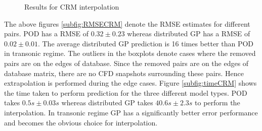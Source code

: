 \begin{figure}[!ht]
  \centering
  \quad
  \caption{Results for CRM interpolation}
\end{figure}

The above figures \ref{subfig:RMSECRM} denote the RMSE estimates for different pairs. POD has a RMSE of $0.32\pm0.23$ whereas distributed GP has a RMSE of $0.02\pm0.01$. The average distributed GP prediction is 16 times better than POD in transonic regime. The outliers in the boxplots denote cases where the removed pairs are on the edges of database. Since the removed pairs are on the edges of database matrix, there are no CFD snapshots surrounding these pairs. Hence extrapolation is performed during the edge cases. Figure \ref{subfig:timeCRM} shows the time taken to perform prediction for the three different model types. POD takes $0.5s\pm0.03s$ whereas distributed GP takes $40.6s\pm2.3s$ to perform the interpolation. In transonic regime GP has a significantly better error performance and becomes the obvious choice for interpolation.

